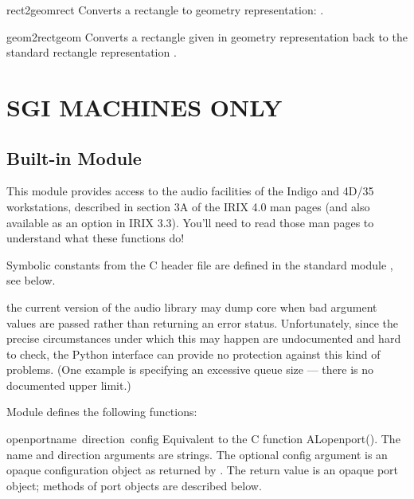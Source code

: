 \begin{funcdesc}{rect2geom}{rect}
Converts a rectangle to geometry representation:
.
\end{funcdesc}

\begin{funcdesc}{geom2rect}{geom}
Converts a rectangle given in geometry representation back to the
standard rectangle representation
.
\end{funcdesc}

\chapter{SGI MACHINES ONLY}

\section{Built-in Module }

This module provides access to the audio facilities of the Indigo and
4D/35 workstations, described in section 3A of the IRIX 4.0 man pages
(and also available as an option in IRIX 3.3).  You'll need to read
those man pages to understand what these functions do!

Symbolic constants from the C header file  are defined
in the standard module , see below.

 the current version of the audio library may dump core
when bad argument values are passed rather than returning an error
status.  Unfortunately, since the precise circumstances under which
this may happen are undocumented and hard to check, the Python
interface can provide no protection against this kind of problems.
(One example is specifying an excessive queue size --- there is no
documented upper limit.)

Module  defines the following functions:

\renewcommand{\indexsubitem}{(in module al)}
\begin{funcdesc}{openport}{name\, direction\, config}
Equivalent to the C function ALopenport().  The name and direction
arguments are strings.  The optional config argument is an opaque
configuration object as returned by .  The return
value is an opaque port object; methods of port objects are described
below.
\end{funcdesc}

